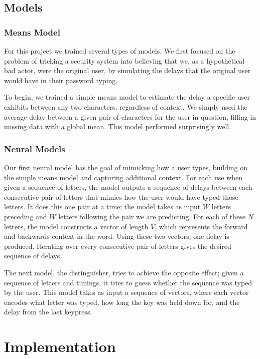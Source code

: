 \documentclass{amsart}
\begin{document}
\begin{multicols*}{2}
\subsection{Models}
\subsubsection{Means Model}
For this project we trained several types of models. We first focused on the problem of tricking a security system into believing that we, as a hypothetical bad actor, were the original user, by simulating the delays that the original user would have in their password typing.

To begin, we trained a simple means model to estimate the delay a specific user exhibits between any two characters, regardless of context. We simply used the average delay between a given pair of characters for the user in question, filling in missing data with a global mean. This model performed surprisingly well.

\subsubsection{Neural Models}
Our first neural model has the goal of mimicking how a user types, building on the simple means model and capturing additional context. For each use when given a sequence of letters, the model outputs a sequence of delays between each consecutive pair of letters that mimics how the user would have typed those letters. It does this one pair at a time; the model takes as input $W$ letters preceding and $W$ letters following the pair we are predicting. For each of these $N$ letters, the model constructs a vector of length $V$, which represents the forward and backwards context in the word. Using these two vectors, one delay is produced. Iterating over every consecutive pair of letters gives the desired sequence of delays.

The next model, the distinguisher, tries to achieve the opposite effect; given a sequence of letters and timings, it tries to guess whether the sequence was typed by the user. This model takes as input a sequence of vectors, where each vector encodes what letter was typed, how long the key was held down for, and the delay from the last keypress.

\section{Implementation}


\end{multicols*}
\end{document}
